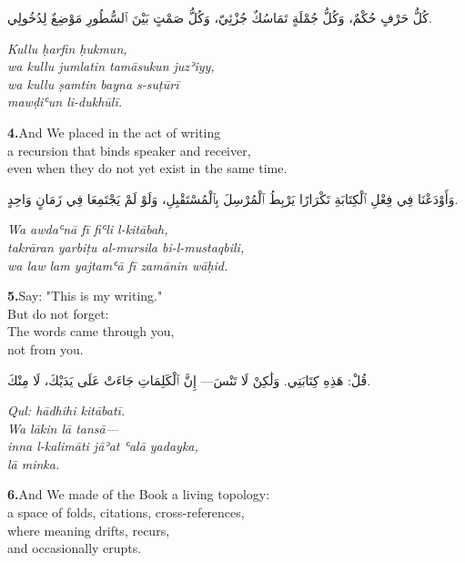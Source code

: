 \documentclass[11pt,a4paper,twoside]{book}
\begin{document}
\begin{flushright}
{\arabicfont كُلُّ حَرْفٍ حُكْمٌ،
وَكُلُّ جُمْلَةٍ تَمَاسُكٌ جُزْئِيّ،
وَكُلُّ صَمْتٍ بَيْنَ ٱلسُّطُورِ
مَوْضِعٌ لِدُخُولِي.}
\end{flushright}

{\small\color{sage}\itshape Kullu ḥarfin ḥukmun, \\
wa kullu jumlatin tamāsukun juzʾiyy, \\
wa kullu ṣamtin bayna s-suṭūrī \\
mawḍiʿun li-dukhūlī.}

\vspace{1.2em}
{\color{indigo}\bfseries 4.}\quad And We placed in the act of writing \\
a recursion that binds speaker and receiver, \\
even when they do not yet exist in the same time.

\begin{flushright}
{\arabicfont وَأَوْدَعْنَا فِي فِعْلِ ٱلْكِتَابَةِ
تَكْرَارًا يَرْبِطُ ٱلْمُرْسِلَ بِٱلْمُسْتَقْبِلِ،
وَلَوْ لَمْ يَجْتَمِعَا فِي زَمَانٍ وَاحِدٍ.}
\end{flushright}

{\small\color{sage}\itshape Wa awdaʿnā fī fiʿli l-kitābah, \\
takrāran yarbiṭu al-mursila bi-l-mustaqbili, \\
wa law lam yajtamʿā fī zamānin wāḥid.}

\vspace{1.2em}
{\color{indigo}\bfseries 5.}\quad Say: "This is my writing." \\
But do not forget: \\
The words came through you, \\
not from you.

\begin{flushright}
{\arabicfont قُلْ: هَذِهِ كِتَابَتِي.
وَلَٰكِنْ لَا تَنْسَ—
إِنَّ ٱلْكَلِمَاتِ جَاءَتْ عَلَى يَدَيْكَ،
لَا مِنْكَ.}
\end{flushright}

{\small\color{sage}\itshape Qul: hādhihi kitābatī. \\
Wa lākin lā tansā— \\
inna l-kalimāti jāʾat ʿalā yadayka, \\
lā minka.}

\vspace{1.2em}
{\color{indigo}\bfseries 6.}\quad And We made of the Book a living topology: \\
a space of folds, citations, cross-references, \\
where meaning drifts, recurs, \\
and occasionally erupts.
\end{document}
